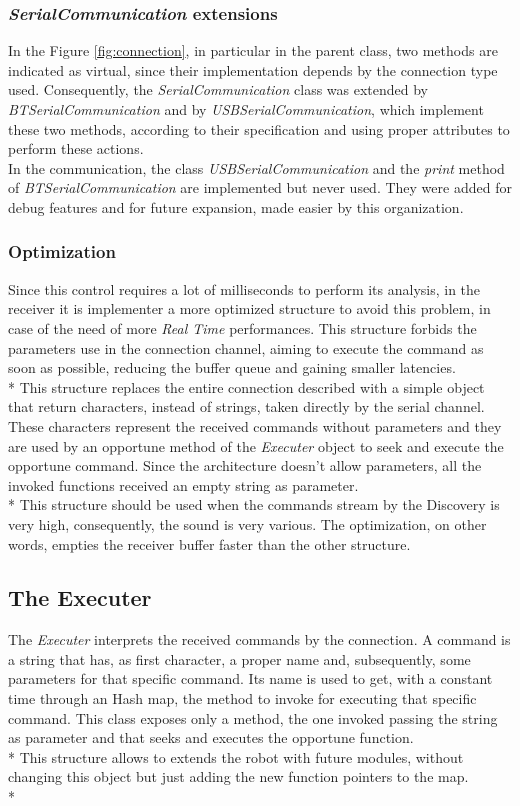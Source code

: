 \subsubsection{\textit{SerialCommunication} extensions}
In the Figure \ref{fig:connection}, in particular in the parent class, two methods are indicated as virtual, since their implementation depends by the connection type used. Consequently, the \textit{SerialCommunication} class was extended by \textit{BTSerialCommunication} and by \textit{USBSerialCommunication}, which implement these two methods, according to their specification and using proper attributes to perform these actions.\\
In the communication, the class \textit{USBSerialCommunication} and the \textit{print} method of \textit{BTSerialCommunication} are implemented but never used. They were added for debug features and for future expansion, made easier by this organization.

\subsubsection{Optimization}
Since this control requires a lot of milliseconds to perform its analysis, in the receiver it is implementer a more optimized structure to avoid this problem, in case of the need of more \textit{Real Time} performances. This structure forbids the parameters use in the connection channel, aiming to execute the command as soon as possible, reducing the buffer queue and gaining smaller latencies.\\*
This structure replaces the entire connection described with a simple object that return characters, instead of strings, taken directly by the serial channel. These characters represent the received commands without parameters and they are used by an opportune method of the \textit{Executer} object to seek and execute the opportune command. Since the architecture doesn't allow parameters, all the invoked functions received an empty string as parameter.\\*
This structure should be used when the commands stream by the Discovery is very high, consequently, the sound is very various. The optimization, on other words, empties the receiver buffer faster than the other structure.

\subsection{The Executer}
The \textit{Executer} interprets the received commands by the connection. A command is a string that has, as first character, a proper name and, subsequently, some parameters for that specific command. Its name is used to get, with a constant time through an Hash map, the method to invoke for executing that specific command. This class exposes only a method, the one invoked passing the string as parameter and that seeks and executes the opportune function.\\*
This structure allows to extends the robot with future modules, without changing this object but just adding the new function pointers to the map.\\*

